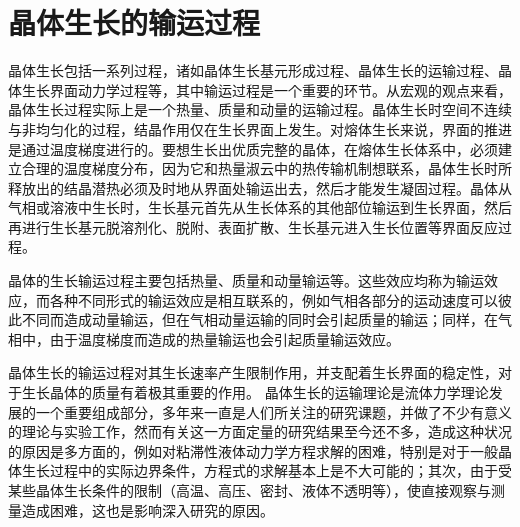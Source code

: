 \section{晶体生长的输运过程}
晶体生长包括一系列过程，诸如晶体生长基元形成过程、晶体生长的运输过程、晶体生长界面动力学过程等，其中输运过程是一个重要的环节。从宏观的观点来看，晶体生长过程实际上是一个热量、质量和动量的运输过程。晶体生长时空间不连续与非均匀化的过程，结晶作用仅在生长界面上发生。对熔体生长来说，界面的推进是通过温度梯度进行的。要想生长出优质完整的晶体，在熔体生长体系中，必须建立合理的温度梯度分布，因为它和热量淑云中的热传输机制想联系，晶体生长时所释放出的结晶潜热必须及时地从界面处输运出去，然后才能发生凝固过程。晶体从气相或溶液中生长时，生长基元首先从生长体系的其他部位输运到生长界面，然后再进行生长基元脱溶剂化、脱附、表面扩散、生长基元进入生长位置等界面反应过程。

晶体的生长输运过程主要包括热量、质量和动量输运等。这些效应均称为输运效应，而各种不同形式的输运效应是相互联系的，例如气相各部分的运动速度可以彼此不同而造成动量输运，但在气相动量运输的同时会引起质量的输运；同样，在气相中，由于温度梯度而造成的热量输运也会引起质量输运效应。

晶体生长的输运过程对其生长速率产生限制作用，并支配着生长界面的稳定性，对于生长晶体的质量有着极其重要的作用。
晶体生长的运输理论是流体力学理论发展的一个重要组成部分，多年来一直是人们所关注的研究课题，并做了不少有意义的理论与实验工作，然而有关这一方面定量的研究结果至今还不多，造成这种状况的原因是多方面的，例如对粘滞性液体动力学方程求解的困难，特别是对于一般晶体生长过程中的实际边界条件，方程式的求解基本上是不大可能的；其次，由于受某些晶体生长条件的限制（高温、高压、密封、液体不透明等），使直接观察与测量造成困难，这也是影响深入研究的原因。

